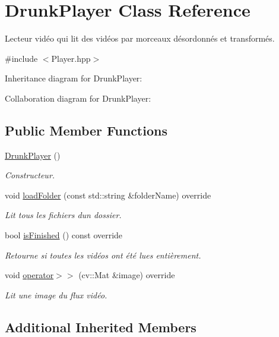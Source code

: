 \hypertarget{classDrunkPlayer}{}\section{Drunk\+Player Class Reference}
\label{classDrunkPlayer}


Lecteur vidéo qui lit des vidéos par morceaux désordonnés et transformés.  




{\ttfamily \#include $<$Player.\+hpp$>$}



Inheritance diagram for Drunk\+Player\+:


Collaboration diagram for Drunk\+Player\+:
\subsection*{Public Member Functions}
\begin{DoxyCompactItemize}
\item 
\hyperlink{classDrunkPlayer_a39c64a774a19456f3a4c194ec5e1131f}{Drunk\+Player} ()
\begin{DoxyCompactList}\small\item\em Constructeur. \end{DoxyCompactList}\item 
void \hyperlink{classDrunkPlayer_a235e60ea8a97c4d26277b066c2cebe80}{load\+Folder} (const std\+::string \&folder\+Name) override
\begin{DoxyCompactList}\small\item\em Lit tous les fichiers d\textquotesingle{}un dossier. \end{DoxyCompactList}\item 
bool \hyperlink{classDrunkPlayer_a9c032dda7df01fafc757fb1f4e265bb4}{is\+Finished} () const override
\begin{DoxyCompactList}\small\item\em Retourne si toutes les vidéos ont été lues entièrement. \end{DoxyCompactList}\item 
void \hyperlink{classDrunkPlayer_a2662f5010e15c95ca6639f56f012aed1}{operator$>$$>$} (cv\+::\+Mat \&image) override
\begin{DoxyCompactList}\small\item\em Lit une image du flux vidéo. \end{DoxyCompactList}\end{DoxyCompactItemize}
\subsection*{Additional Inherited Members}


